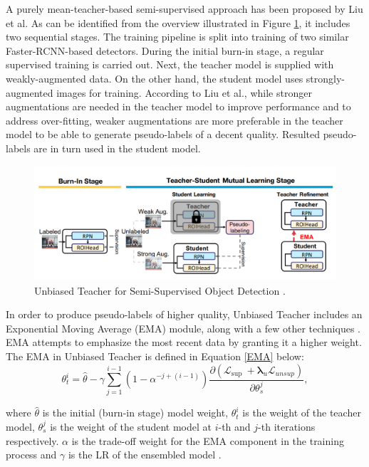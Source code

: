 A purely mean-teacher-based semi-supervised approach has been proposed by Liu et al. \cite{Liu2021} As can be identified from the overview illustrated in Figure \ref{unbiased}, it includes two sequential stages. The training pipeline is split into training of two similar Faster-RCNN-based detectors. During the initial burn-in stage, a regular supervised training is carried out. Next, the teacher model is supplied with weakly-augmented data. On the other hand, the student model uses strongly-augmented images for training. According to Liu et al., while stronger augmentations are needed in the teacher model to improve performance and to address over-fitting, weaker augmentations are more preferable in the teacher model to be able to generate pseudo-labels of a decent quality. Resulted pseudo-labels are in turn used in the student model.   
\begin{figure}[htb]
	\begin{center}
		\includegraphics[width=14cm]{./unbiased.png}
	\end{center}
	\caption{Unbiased Teacher for Semi-Supervised Object Detection \cite{Liu2021}.}\label{unbiased}
	\begin{center}
	\end{center}
\end{figure}

In order to produce pseudo-labels of higher quality, Unbiased Teacher includes an Exponential Moving Average (EMA) module, along with a few other techniques \cite{Liu2021}. EMA attempts to emphasize the most recent data by granting it a higher weight. The EMA in Unbiased Teacher is defined in Equation \ref{EMA} below: 
\begin{equation}
\theta_{t}^{i}=\hat{\theta}-\gamma \sum_{j=1}^{i-1}\left(1-\alpha^{-j+(i-1)}\right) \frac{\partial\left(\mathcal{L}_{\text {sup }}+\boldsymbol{\lambda}_{u} \mathcal{L}_{u n s u p}\right)}{\partial \theta_{s}^{j}}
\label{EMA}
,
\end{equation}

where $\hat{\theta}$ is the initial (burn-in stage) model weight, $\theta_{t}^{i}$ is the weight of the teacher model, $\theta_{s}^{j}$ is the weight of the student model  at $i$-th and $j$-th iterations respectively. $\alpha$ is the trade-off weight for the EMA component in the training process and $\gamma$ is the LR of the ensembled model \cite{Liu2021}.

